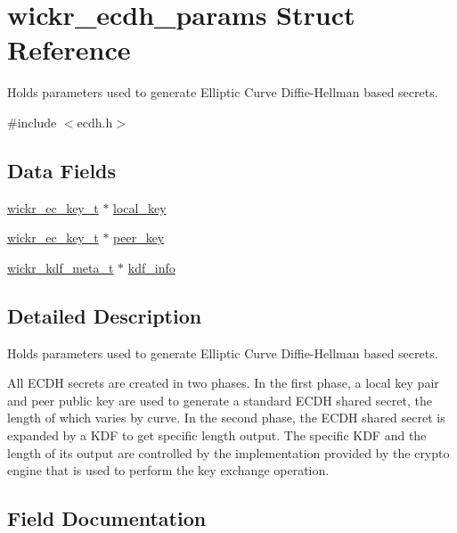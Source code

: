\hypertarget{structwickr__ecdh__params}{}\section{wickr\+\_\+ecdh\+\_\+params Struct Reference}
\label{structwickr__ecdh__params}


Holds parameters used to generate Elliptic Curve Diffie-\/\+Hellman based secrets.  




{\ttfamily \#include $<$ecdh.\+h$>$}

\subsection*{Data Fields}
\begin{DoxyCompactItemize}
\item 
\hyperlink{structwickr__ec__key}{wickr\+\_\+ec\+\_\+key\+\_\+t} $\ast$ \hyperlink{structwickr__ecdh__params_aab5a55e6a516ab8268ef6739ae1422cd}{local\+\_\+key}
\item 
\hyperlink{structwickr__ec__key}{wickr\+\_\+ec\+\_\+key\+\_\+t} $\ast$ \hyperlink{structwickr__ecdh__params_ab17d6191b23fa7fd1befd03b2eee4ba9}{peer\+\_\+key}
\item 
\hyperlink{structwickr__kdf__meta}{wickr\+\_\+kdf\+\_\+meta\+\_\+t} $\ast$ \hyperlink{structwickr__ecdh__params_a0259f327ae0bdcc9e44b1d43a1216cac}{kdf\+\_\+info}
\end{DoxyCompactItemize}


\subsection{Detailed Description}
Holds parameters used to generate Elliptic Curve Diffie-\/\+Hellman based secrets. 

All E\+C\+DH secrets are created in two phases. In the first phase, a local key pair and peer public key are used to generate a standard E\+C\+DH shared secret, the length of which varies by curve. In the second phase, the E\+C\+DH shared secret is expanded by a K\+DF to get specific length output. The specific K\+DF and the length of it\textquotesingle{}s output are controlled by the implementation provided by the crypto engine that is used to perform the key exchange operation. 

\subsection{Field Documentation}
\mbox{\label{structwickr__ecdh__params_a0259f327ae0bdcc9e44b1d43a1216cac}} 
